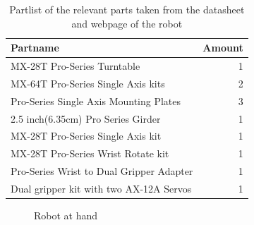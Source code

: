 \begin{table}[htbp]
\centering
\caption{Partlist of the relevant parts taken from the datasheet and webpage of the robot}
\label{table:partlist}
    \begin{tabular}{ l r}
        \toprule
        Partname  & Amount \\
        \midrule
        MX-28T Pro-Series Turntable & 1\\
        MX-64T Pro-Series Single Axis kits& 2\\
        Pro-Series Single Axis Mounting Plates & 3\\
        2.5 inch(6.35cm) Pro Series Girder & 1 \\
        MX-28T Pro-Series Single Axis kit & 1 \\
        MX-28T Pro-Series Wrist Rotate kit & 1\\
        Pro-Series Wrist to Dual Gripper Adapter & 1\\
        Dual gripper kit with two AX-12A Servos& 1\\
               \bottomrule
    \end{tabular}
\end{table}



\begin{figure}[htbp]
  \centering
  
  \caption{Robot at hand}
  \label{fig:utgangspunkt}
\end{figure}



